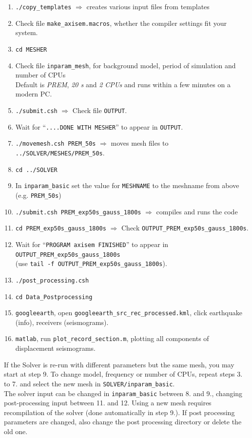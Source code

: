 \documentclass{article}
\begin{document}
\begin{enumerate}
\item \verb|./copy_templates| $\Rightarrow$ creates various input files from templates
\item Check file \verb|make_axisem.macros|, whether the compiler settings fit your system.
\item \verb|cd MESHER| 
\item Check file {\tt inparam\_mesh}, for background model, period of simulation and number of CPUs \\
      Default is \textit{PREM}, \textit{20 s} and \textit{2 CPUs} and runs within a few minutes on a modern PC.
\item \verb|./submit.csh| $\Rightarrow$ Check file {\tt OUTPUT}.
\item Wait for ``{\tt ....DONE WITH MESHER}'' to appear in {\tt OUTPUT}.
\item \verb|./movemesh.csh PREM_50s| $\Rightarrow$ moves mesh files to \verb|../SOLVER/MESHES/PREM_50s|.
\item \verb|cd ../SOLVER|
\item In \verb|inparam_basic| set the value for \verb|MESHNAME| to the meshname from above (e.g. \verb|PREM_50s|)
\item \verb|./submit.csh PREM_exp50s_gauss_1800s|  $\Rightarrow$ compiles and runs the code
\item \verb|cd PREM_exp50s_gauss_1800s| $\Rightarrow$ Check \verb|OUTPUT_PREM_exp50s_gauss_1800s|.
\item Wait for ``\verb|PROGRAM axisem FINISHED|'' to appear in \verb|OUTPUT_PREM_exp50s_gauss_1800s| \\(use \verb|tail -f OUTPUT_PREM_exp50s_gauss_1800s|).
\item \verb|./post_processing.csh|
\item \verb|cd Data_Postprocessing| 
\item \verb|googleearth|, open {\tt googleearth\_src\_rec\_processed.kml}, click
        earthquake (info), receivers (seismograms).
\item {\tt matlab}, run {\tt plot\_record\_section.m}, plotting all components
        of displacement seismograms.

\end{enumerate}
If the Solver is re-run with different parameters but the same mesh, you may start at step 9. 
To change model, frequency or number of CPUs, repeat steps 3. to 7. and select the new mesh in \verb|SOLVER/inparam_basic|. \\
The solver input can be changed in \verb|inparam_basic| between 8. and 9.,
changing post-processing input between 11. and 12. Using a new mesh requires
recompilation of the solver (done automatically in step 9.). If post
processing parameters are changed, also change the post processing directory or
delete the old one.
\end{document}
